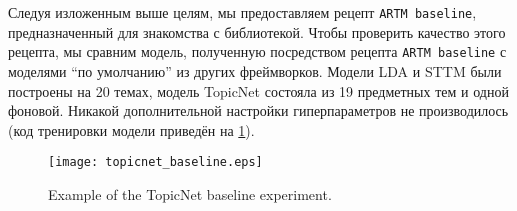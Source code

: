 Следуя изложенным выше целям, мы предоставляем рецепт \texttt{ARTM baseline}, предназначенный для знакомства с библиотекой. Чтобы проверить качество этого рецепта, мы сравним модель, полученную посредством рецепта \texttt{ARTM baseline} с моделями ``по умолчанию'' из других фреймворков. Модели LDA и STTM были построены на 20 темах, модель TopicNet состояла из 19 предметных тем и одной фоновой. Никакой дополнительной настройки гиперпараметров не производилось (код тренировки модели приведён на \ref{topicnet_baseline}).  


\begin{figure}[!ht]

    \centering

    \texttt{[image: topicnet\_baseline.eps]}

    \caption{Example of the TopicNet baseline experiment.}

\label{topicnet_baseline}

\end{figure} 

